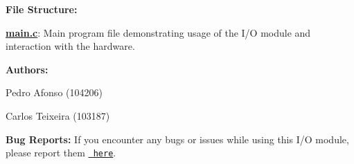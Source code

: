 {\bfseries{File Structure\+:}}
\begin{DoxyItemize}
\item {\bfseries{\mbox{\hyperlink{main_8c}{main.\+c}}}}\+: Main program file demonstrating usage of the I/O module and interaction with the hardware.
\end{DoxyItemize}

{\bfseries{Authors\+:}}
\begin{DoxyItemize}
\item Pedro Afonso (104206)
\item Carlos Teixeira (103187)
\end{DoxyItemize}

{\bfseries{Bug Reports\+:}} If you encounter any bugs or issues while using this I/O module, please report them \href{https://github.com/pisko19/SETR/issues}{\texttt{ here}}. 